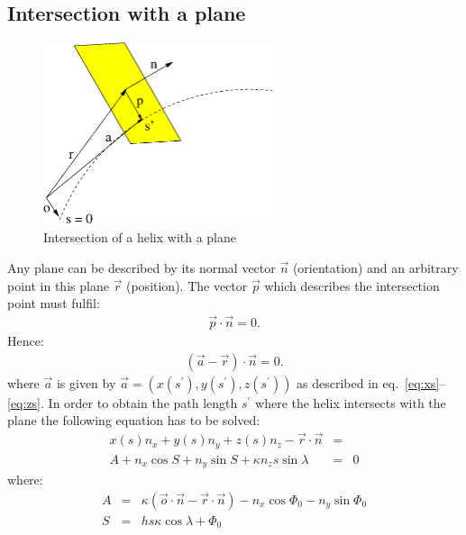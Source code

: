 \documentclass[twoside]{article}
\begin{document}
\subsection{Intersection with a plane}

\begin{figure}[thb]
    \begin{center}
        \includegraphics[width=0.6\textwidth]{helix3.eps}
        \caption{Intersection of a helix with a plane}
        \label{fig:plane}
    \end{center}
\end{figure}

Any plane can be described by its normal vector $\vec{n}$
(orientation) and an arbitrary point in this plane $\vec{r}$ (position). The vector
$\vec{p}$ which describes the intersection point must fulfil:
\begin{eqnarray}
    \vec{p} \cdot \vec{n} = 0.
\end{eqnarray}
Hence:
\begin{eqnarray}
    (\vec{a}-\vec{r}) \cdot \vec{n} = 0. \label{eq:ansatz}
\end{eqnarray}
where $\vec{a}$ is given by $\vec{a} = (x(s^{\prime}),
y(s^{\prime}), z(s^{\prime}))$ as described in
eq.~\ref{eq:xs}--\ref{eq:zs}.  In order to obtain the path length
$s^{\prime}$ where the helix intersects with the plane the
following equation has to be solved:
\begin{eqnarray}
    x(s) n_x + y(s) n_y + z(s) n_z - \vec{r} \cdot \vec{n} &=& \\
    A + n_x \cos S
    + n_y \sin S
    + \kappa n_z s \sin \lambda &=& 0 \label{eq:inter}
\end{eqnarray}
where:
\begin{eqnarray}
    A &=& \kappa (\vec{o} \cdot \vec{n} - \vec{r} \cdot \vec{n}) - n_x \cos \Phi_0 - n_y \sin \Phi_0 \\
    S &=& h s \kappa \cos \lambda + \Phi_0  
\end{eqnarray}
\end{document}
